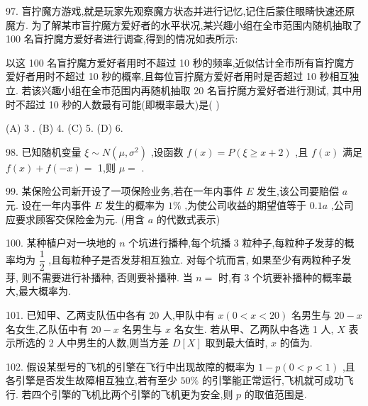 97. 盲拧魔方游戏,就是玩家先观察魔方状态并进行记忆,记住后蒙住眼睛快速还原魔方. 为了解某市盲拧魔方爱好者的水平状况,某兴趣小组在全市范围内随机抽取了 100 名盲拧魔方爱好者进行调查,得到的情况如表所示:

\begin{center}
\end{center}

以这 100 名盲拧魔方爱好者用时不超过 10 秒的频率,近似估计全市所有盲拧魔方爱好者用时不超过 10 秒的概率,且每位盲拧魔方爱好者用时是否超过 10 秒相互独立. 若该兴趣小组在全市范围内再随机抽取 20 名盲拧魔方爱好者进行测试, 其中用时不超过 10 秒的人数最有可能(即概率最大)是(   )

(A) 3 . (B) 4. (C) 5. (D) 6.

98. 已知随机变量 $\xi  \sim  N\left( {\mu ,{\sigma }^{2}}\right)$ ,设函数 $f\left( x\right)  = P\left( {\xi  \geq  x + 2}\right)$ ,且 $f\left( x\right)$ 满足 $f\left( x\right)  + f\left( {-x}\right)  =$ 1,则 $\mu  =$ \blkda{}.

99. 某保险公司新开设了一项保险业务,若在一年内事件 $E$ 发生,该公司要赔偿 $a$ 元. 设在一年内事件 $E$ 发生的概率为 $1\%$ ,为使公司收益的期望值等于 ${0.1a}$ ,公司应要求顾客交保险金为\blkda{}元. (用含 $a$ 的代数式表示)

100. 某种植户对一块地的 $n$ 个坑进行播种,每个坑播 3 粒种子,每粒种子发芽的概率均为 $\dfrac{1}{2}$ ,且每粒种子是否发芽相互独立. 对每个坑而言, 如果至少有两粒种子发芽, 则不需要进行补播种, 否则要补播种. 当 $n =$ \blkda{}时,有 3 个坑要补播种的概率最大,最大概率为\blkda{}.

101. 已知甲、乙两支队伍中各有 20 人,甲队中有 $x\left( {0 < x < {20}}\right)$ 名男生与 ${20} - x$ 名女生,乙队伍中有 ${20} - x$ 名男生与 $x$ 名女生. 若从甲、乙两队中各选 1 人, $X$ 表示所选的 2 人中男生的人数,则当方差 $D\left\lbrack  X\right\rbrack$ 取到最大值时, $x$ 的值为\blkda{}.

102. 假设某型号的飞机的引擎在飞行中出现故障的概率为 $1 - p\left( {0 < p < 1}\right)$ ,且各引擎是否发生故障相互独立,若有至少 ${50}\%$ 的引擎能正常运行,飞机就可成功飞行. 若四个引擎的飞机比两个引擎的飞机更为安全,则 $p$ 的取值范围是\blkda{}.

